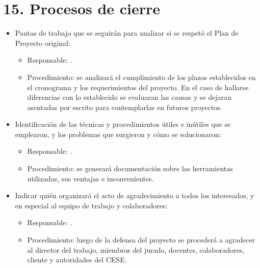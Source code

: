\documentclass[
11pt, %
codirector, %
]{charter}
\begin{document}
\section{15. Procesos de cierre}    
\label{sec:cierre}

\begin{itemize}
	\item Pautas de trabajo que se seguirán para analizar si se respetó el Plan de Proyecto original:
	\begin{itemize}
		\item Responsable: \authorname. 
		\item Procedimiento: se analizará el cumplimiento de los plazos establecidos en el cronograma y los requerimientos del proyecto. En el caso de hallarse diferencias con lo establecido se evaluaran las causas y se dejaran asentadas por escrito para contemplarlas en futuros proyectos.
	\end{itemize}
	 
	\item Identificación de las técnicas y procedimientos útiles e inútiles que se emplearon, y los problemas que surgieron y cómo se solucionaron:
	\begin{itemize}
		\item Responsable: \authorname.
		\item Procedimiento: se generará documentación sobre las herramientas utilizadas, sus ventajas e inconvenientes.
	\end{itemize}
	
	\item Indicar quién organizará el acto de agradecimiento a todos los interesados, y en especial al equipo de trabajo y colaboradores:
	\begin{itemize}
		\item Responsable: \authorname.
		\item Procedimiento: luego de la defensa del proyecto se procederá a agradecer al director del trabajo, miembros del jurado, docentes, colaboradores, cliente y autoridades del CESE.
	\end{itemize}
\end{itemize}
\end{document}
